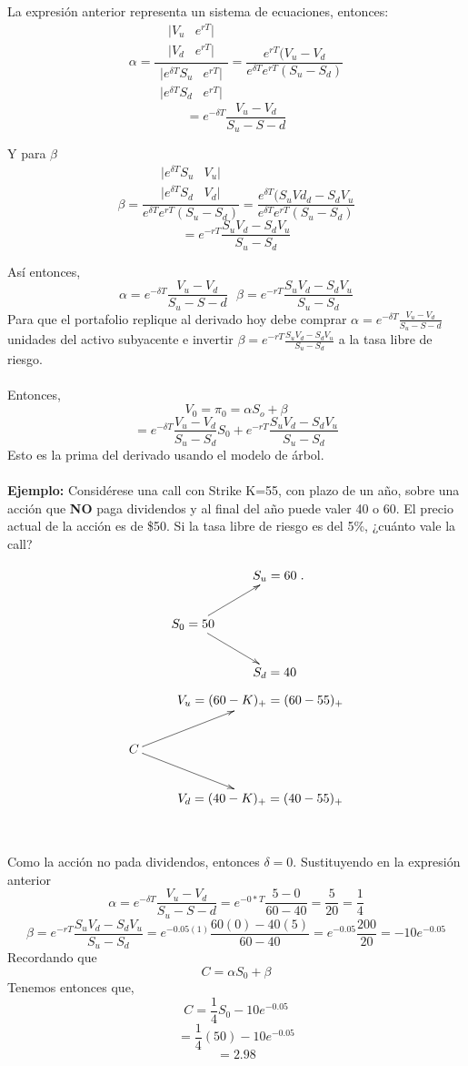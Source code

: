 \documentclass[12pts]{extarticle}
\begin{document}
La expresión anterior representa un sistema de ecuaciones, entonces: 
$$\alpha=\frac{ \begin{matrix} 
                            |V_u & e^{rT}| \\ |V_d & e^{rT}|\end{matrix} }{\begin{matrix}
                                                                                                                          | e^{\delta T}S_u & e^{rT}| \\| e^{\delta T}S_d & e^{rT} |\end{matrix}}=\frac{e^{rT}(V_u-V_d}{e^{\delta T}e^{rT}(S_u-S_d)}$$
$$=e^{-\delta T}\frac{V_u-V_d}{S_u-S-d}$$ 

Y para $\beta$ 
$$\beta= \frac{ \begin{matrix} 
                            |e^{\delta T}S_u & V_u| \\ |e^{\delta T}S_d & V_d|\end{matrix} }{e^{\delta T} e^{rT}(S_u-S_d)}=\frac{e^{\delta T}(S_u Vd_d-S_dV_u}{e^{\delta T}e^{rT}(S_u-S_d)}$$
$$=e^{-rT}\frac{S_u V_d-S_d V_u}{S_u-S_d}$$

Así entonces, 
$$\alpha = e^{-\delta T}\frac{V_u-V_d}{S_u-S-d} \,  \, \, \, \beta=e^{-rT}\frac{S_u V_d-S_d V_u}{S_u-S_d}$$
Para que el portafolio replique al derivado hoy debe comprar $\alpha = e^{-\delta T}\frac{V_u-V_d}{S_u-S-d}$ unidades del activo subyacente e invertir $\beta=e^{-rT}\frac{S_u V_d-S_d V_u}{S_u-S_d}$ a la tasa libre de riesgo. \\ \\ 
Entonces, $$ V_0=\pi_0=\alpha S_o + \beta $$ 
$$= e^{-\delta T}\frac{V_u-V_d}{S_u-S_d} S_0 + e^{-rT}\frac{S_u V_d-S_d V_u}{S_u-S_d}$$
Esto es la prima del derivado usando el modelo de árbol. 
\\ \\ 
\textbf{Ejemplo:} Considérese una call con Strike K=55, con plazo de un año, sobre una acción que \textbf{NO} paga dividendos y al final del año puede valer 40 o 60. El precio actual de la acción es de \$50. Si la tasa libre de riesgo es del 5\%, ¿cuánto vale la call? 

$$\xymatrix{&S_u=60 \\ S_0= 50 \ar[ru] \ar[dr] & \\ &S_d=40}.$$
$$\xymatrix{&V_u=(60-K)_+=(60-55)_+ \\ C \ar[ru] \ar[dr]&  \\ & V_d=(40-K)_+=(40-55)_+}$$
\\ \\ Como la acción no pada dividendos, entonces $\delta =0$. Sustituyendo en la expresión anterior 
$$ \alpha = e^{-\delta T}\frac{V_u-V_d}{S_u-S-d}=e^{-0*T}\frac{5-0}{60-40} = \frac{5}{20}=\frac{1}{4}$$ 
$$  \beta=e^{-rT}\frac{S_u V_d-S_d V_u}{S_u-S_d}=e^{-0.05(1)}\frac{60(0)-40(5)}{60-40}=e^{-0.05}\frac{200}{20}=-10e^{-0.05}$$
Recordando que 
$$C=\alpha S_0 + \beta $$
Tenemos entonces que, 
$$C=\frac{1}{4}S_0-10e^{-0.05}$$ 
$$=\frac{1}{4}(50)-10e^{-0.05}$$
$$=2.98$$ 
\end{document}
